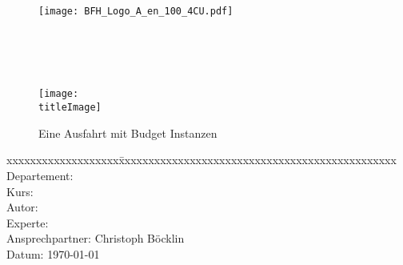 \thispagestyle{empty}

\begin{figure}
	\texttt{[image: BFH\_Logo\_A\_en\_100\_4CU.pdf]}
\end{figure}


\begin{minipage}[c][3cm][c]{\linewidth} {
	\centering
	\vspace*{2cm}
	{\fontsize{24pt}{0pt}\selectfont \textbf{\doctitle}}  \\
	\vspace*{0.6cm}
	{\fontsize{20pt}{0pt}\selectfont {Geodeatenprozessierung\\ mit Budget Instanzen}}  \\
	\vspace*{1cm}
	{\fontsize{14pt}{0pt}\selectfont \doctype}  \\
}
\end{minipage}


\vspace{1.5cm}


\begin{figure}[H]
	\centering
	\makebox[0.9\linewidth]{\color{BFHGray} \rule{0.9\linewidth}{10pt}}
	\texttt{[image: \\titleImage]}
	\makebox[0.9\linewidth]{\color{BFHGray} \rule{0.9\linewidth}{10pt}}
    \caption{Eine Ausfahrt mit Budget Instanzen\space\cite{HippieCar:1}}
\end{figure}

\vfill

\begin{minipage}[c][3cm][c]{\linewidth}
{
	\centering
	\begin{tabbing}
		xxxxxxxxxxxxxxxxxxx\=xxxxxxxxxxxxxxxxxxxxxxxxxxxxxxxxxxxxxxxxxxxxxxx \kill
		Departement:	\> \fieldofstudies \\
		Kurs:			\> \course \\
		Autor:		\> \docauthor \\%
		Experte:		\> \prof \\
		Ansprechpartner:      \> Christoph Böcklin \\
		Datum:			\> \today \\
	\end{tabbing}
}
\end{minipage}

\pagebreak